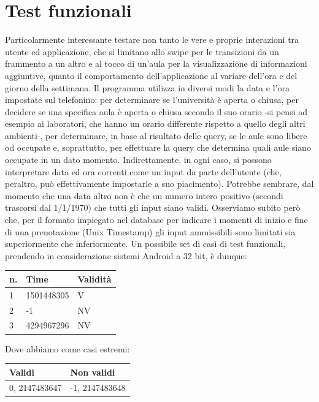 \documentclass{article}
\begin{document}
	\part{Test funzionali}
	Particolarmente interessante testare non tanto le vere e proprie interazioni tra utente ed applicazione, che si limitano allo swipe per le transizioni da un frammento a un altro e al tocco di un'aula per la visualizzazione di informazioni aggiuntive, quanto il comportamento dell'applicazione al variare dell'ora e del giorno della settimana. Il programma utilizza in diversi modi la data e l'ora impostate sul telefonino: per determinare se l'università è aperta o chiusa, per decidere se una specifica aula è aperta o chiusa secondo il suo orario -si pensi ad esempio ai laboratori, che hanno un orario differente rispetto a quello degli altri ambienti-, per determinare, in base al risultato delle query, se le aule sono libere od occupate e, soprattutto, per effettuare la query che determina quali aule siano occupate in un dato momento. Indirettamente, in ogni caso, si possono interpretare data ed ora correnti come un input da parte dell'utente (che, peraltro, può effettivamente impostarle a suo piacimento). Potrebbe sembrare, dal momento che una data altro non è che un numero intero positivo (secondi trascorsi dal 1/1/1970) che tutti gli input siano validi. Osserviamo subito però che, per il formato impiegato nel database per indicare i momenti di inizio e fine di una prenotazione (Unix Timestamp) gli input ammissibili sono limitati sia superiormente che inferiormente.
	Un possibile set di casi di test funzionali, prendendo in considerazione sistemi Android a 32 bit, è dunque:\\
	
\begin{table}[h]
	\centering
	\label{my-label}
	\begin{tabular}{|l|l|l|}
		\hline
		n. & Time       & Validità \\ \hline
		1  & 1501448305 & V        \\ \hline
		2  & -1         & NV       \\ \hline
		3  & 4294967296 & NV       \\ \hline
	\end{tabular}
	
\end{table}

Dove abbiamo come casi estremi:

\begin{table}[h]
	\centering
	\label{my-label}
	\begin{tabular}{|l|l|}
		\hline
		Validi        & Non validi     \\ \hline
		0, 2147483647 & -1, 2147483648 \\ \hline
	\end{tabular}
\end{table}
\end{document}
